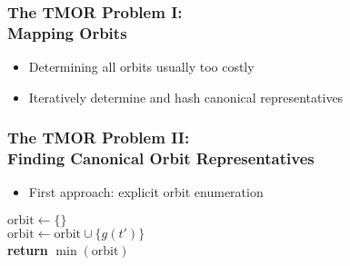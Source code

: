 \documentclass{beamer}
\begin{document}
\begin{frame}
  \frametitle{The TMOR Problem I:\\Mapping Orbits}

  \begin{itemize}
    \setlength\itemsep{.25cm}

    \item<1-> Determining all orbits usually too costly
    \item<2-> Iteratively determine and hash canonical representatives
  \end{itemize}

  \vspace{.25cm}

\end{frame}

\begin{frame}
  \frametitle{The TMOR Problem II:\\Finding Canonical Orbit Representatives}

  \begin{itemize}
    \item First approach: explicit orbit enumeration
  \end{itemize}

  \vspace{.25cm}

  \begin{algorithmic}[1]
    \State $\mathrm{orbit} \gets \{\}$
    \\
        \State $\mathrm{orbit} \gets \mathrm{orbit} \cup \{g(t')\}$
      \EndFor
    \EndWhile
    \\
    \State \textbf{return} $\min(\mathrm{orbit})$
  \EndProcedure
  \end{algorithmic}
\end{frame}
\end{document}
